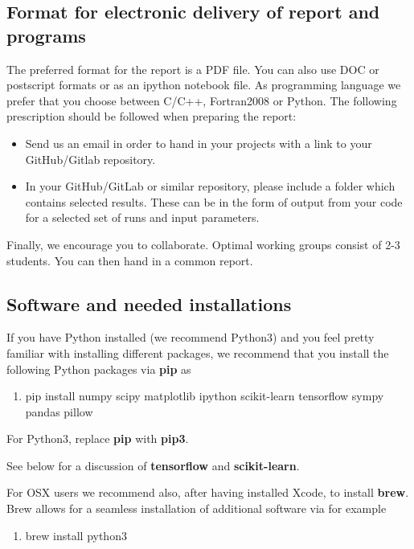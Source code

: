\documentclass[%
oneside,                 %
final,                   %
10pt]{article}
\begin{document}
\noindent
\subsection*{Format for electronic delivery of report and programs}

The preferred format for the report is a PDF file. You can also use DOC or postscript formats or as an ipython notebook file.  As programming language we prefer that you choose between C/C++, Fortran2008 or Python. The following prescription should be followed when preparing the report:

\begin{itemize}
  \item Send us an email in order  to hand in your projects with a link to your GitHub/Gitlab repository.

  \item In your GitHub/GitLab or similar repository, please include a folder which contains selected results. These can be in the form of output from your code for a selected set of runs and input parameters.
\end{itemize}

\noindent
Finally, 
we encourage you to collaborate. Optimal working groups consist of 
2-3 students. You can then hand in a common report. 

\subsection*{Software and needed installations}

If you have Python installed (we recommend Python3) and you feel pretty familiar with installing different packages, 
we recommend that you install the following Python packages via \textbf{pip} as
\begin{enumerate}
\item pip install numpy scipy matplotlib ipython scikit-learn tensorflow sympy pandas pillow
\end{enumerate}

\noindent
For Python3, replace \textbf{pip} with \textbf{pip3}.

See below for a discussion of \textbf{tensorflow} and \textbf{scikit-learn}. 

For OSX users we recommend also, after having installed Xcode, to install \textbf{brew}. Brew allows 
for a seamless installation of additional software via for example
\begin{enumerate}
\item brew install python3
\end{enumerate}
\end{document}
